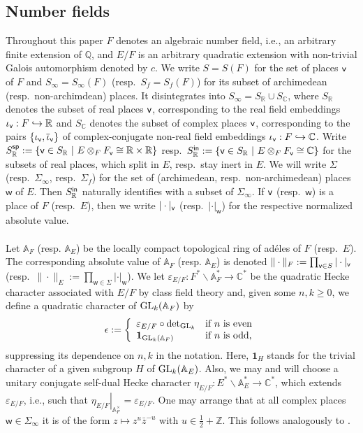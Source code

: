 \documentclass[a4paper,10pt]{amsart}
\theoremstyle{definition}
\numberwithin{equation}{section}
\newcommand{\triv}{{\textbf{1}}}
\def\R{\mathbb R}
\def\Z{\mathbb Z}
\def\A{\mathbb A}
\def\Q{\mathbb Q}
\def\C{\mathbb C}
\def\hra{\hookrightarrow}
\def\ra{\rightarrow}
\def\ww{\mathsf w}
\def\GL{{\rm GL}}
\def\vv{{\sf v}} %
\begin{document}
\subsection{Number fields}\label{sect:nf}
Throughout this paper $F$ denotes an algebraic number field, i.e., an arbitrary finite extension of $\Q$, and $E/F$ is an arbitrary quadratic extension with non-trivial Galois automorphism denoted by $c$. We write $S=S(F)$ for the set of places $\vv$ of $F$ and $S_\infty=S_\infty(F)$ (resp.\ $S_f = S_f(F)$) for its subset of archimedean (resp.\ non-archimdean) places. It disintegrates into $S_\infty=S_\R\cup S_\C$, where $S_\R$ denotes the subset of real places $\vv$, corresponding to the real field embeddings $\iota_\vv: F\hra\R$ and $S_\C$ denotes the subset of complex places $\vv$, corresponding to the pairs $\{\iota_\vv,\overline{\iota}_\vv\}$ of complex-conjugate non-real field embeddings $\iota_\vv: F\hra\C$. Write $S^{\sf sp}_\R:=\{\vv\in S_\R \ | \ E\otimes_{F}F_\vv\cong \R\times\R\}$ resp.\ $S^{\sf in}_\R:=\{\vv\in S_\R \ | \ E\otimes_{F}F_\vv\cong \C\}$ for the subsets of real places, which split in $E$, resp.\ stay inert in $E$. We will write $\Sigma$ (resp.\ $\Sigma_\infty$, resp.\ $\Sigma_f$) for the set of (archimedean, resp.\ non-archimedean) places $\ww$ of $E$. Then $S^{\sf in}_\R$ naturally identifies with a subset of $\Sigma_\infty$. If $\vv$ (resp.\ $\ww$) is a place of $F$ (resp.\ $E$), then we write $|\cdot|_\vv$ (resp.\ $|\cdot|_\ww$) for the respective normalized absolute value. \\\\
Let $\A_F$ (resp. $\A_E$) be the locally compact topological ring of ad\'eles of $F$ (resp.\ $E$). The corresponding absolute value of $\A_F$ (resp. $\A_E$) is denoted $\|\cdot\|_F:=\prod_{\vv\in S}|\cdot|_\vv$ (resp.\ $\|\cdot\|_E:=\prod_{\ww\in\Sigma}|\cdot|_\ww$). We let $\varepsilon_{E/F}: F^*\backslash\A^*_F\ra\C^*$ be the quadratic Hecke character associated with $E/F$ by class field theory and, given some $n,k\geq 0$, we define a quadratic character of $\GL_k(\A_F)$ by 
$$\epsilon:=\left\{\begin{array}{ll}
 \varepsilon_{E/F}\circ\textrm{det}_{\GL_k} & \textrm{if $n$ is even} \\
 \triv_{\GL_k(\A_F)} & \textrm{if $n$ is odd,}
\end{array}
\right.$$
suppressing its dependence on $n,k$ in the notation. Here, $\triv_H$ stands for the trivial character of a given subgroup $H$ of $\GL_k(\A_E)$. Also, we may and will choose a unitary conjugate self-dual Hecke character \(\eta_{E/F} :E^*\backslash \A^*_E\ra\C^*\), which extends $\varepsilon_{E/F}$, i.e., such that $\left.\eta_{E/F}\right|_{\mathbb A_F^\times}=\varepsilon_{E/F}$. One may arrange that at all complex places $\ww\in\Sigma_\infty$ it is of the form $z\mapsto z^{u}\bar{z}^{-u}$ with $u\in\tfrac12+\Z$. This follows analogously to \cite[\S 6.9.2]{bel-chen}.
\end{document}
